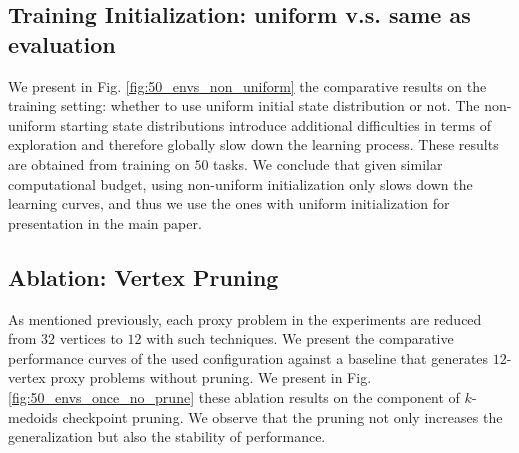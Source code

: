 \subsection{Training Initialization: uniform v.s. same as evaluation}
We present in Fig. \ref{fig:50_envs_non_uniform} the comparative results on the training setting: whether to use uniform initial state distribution or not. The non-uniform starting state distributions introduce additional difficulties in terms of exploration and therefore globally slow down the learning process. These results are obtained from training on $50$ tasks. We conclude that given similar computational budget, using non-uniform initialization only slows down the learning curves, and thus we use the ones with uniform initialization for presentation in the main paper.

\begin{figure*}[htbp]
\centering
\hfill
{}
\hfill
{}
\hfill
{}
\hfill
{}

\caption{\small \textbf{Comparative Results on $50$ training tasks without uniform initial state distribution}: each curve is processed from $20$ independent seed runs.}
\label{fig:50_envs_non_uniform}
\end{figure*}

\subsection{Ablation: Vertex Pruning}
As mentioned previously, each proxy problem in the experiments are reduced from $32$ vertices to $12$ with such techniques. We present the comparative performance curves of the used configuration against a baseline that generates $12$-vertex proxy problems without pruning. We present in Fig. \ref{fig:50_envs_once_no_prune} these ablation results on the component of $k$-medoids checkpoint pruning. We observe that the pruning not only increases the generalization but also the stability of performance.


